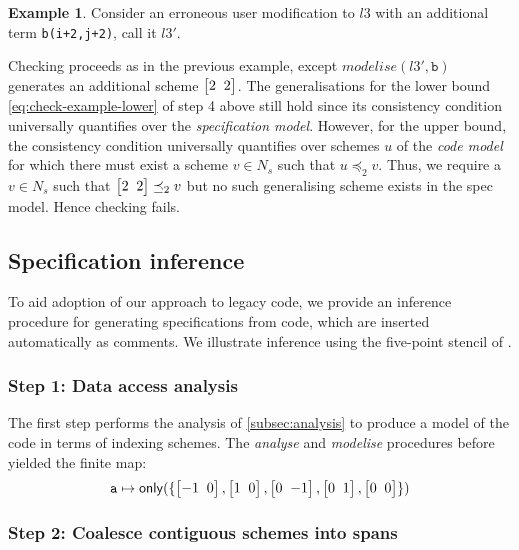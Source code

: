 \documentclass[10pt,preprint,numbers]{sigplanconf}
\newcounter{block}
\theoremstyle{definition}
\newtheorem{example}[block]{Example}
\newcommand{\vtwoh}[2]{\setlength{\arraycolsep}{0em}
\left[\begin{array}{cc}#1 \; & \; #2\end{array}\right]}
\begin{document}
\begin{example}
Consider an erroneous user modification to $l3$ with an
additional term \texttt{b(i+2,j+2)}, call it $l3'$.%
%

Checking proceeds as in the previous example, except
$\mathit{modelise}(l3',\texttt{b})$ generates an additional scheme
$\vtwoh{2}{2}$. The generalisations for
the lower bound \eqref{eq:check-example-lower}
of step 4 above still hold since its consistency condition
universally quantifies over the \emph{specification model}. However, for
the upper bound, the consistency condition universally quantifies
over schemes $u$ of the \emph{code model} for which there must exist
a scheme $v \in N_s$ such that $u \preceq_2 v$. Thus, we require a $v
\in N_s$ such that $\vtwoh{2}{2} \preceq_2 v$ but no such generalising
scheme exists in the spec model. Hence checking fails.
\end{example}

\subsection{Specification inference}
\label{subsec:inference}

To aid adoption of our approach to legacy code, we provide
an inference procedure for generating specifications from code, which
are inserted automatically as comments.
We illustrate inference using the
 five-point stencil of
 .

\subsubsection{Step 1: Data access analysis}
\label{sec:inf-step1}

The first step performs the
analysis of \cref{subsec:analysis} to produce a
model of the code in terms of indexing schemes.
The \emph{analyse} and \emph{modelise} procedures before yielded the finite map:
%
\begin{align*}
\texttt{a} \mapsto \mathsf{only}(\{\vtwoh{-1}{0}, \vtwoh{1}{0},
          \vtwoh{0}{-1}, \vtwoh{0}{1}, \vtwoh{0}{0}\})
\end{align*}
%

\subsubsection{Step 2: Coalesce contiguous schemes into spans}
\label{sec:inf-step3}
\end{document}
